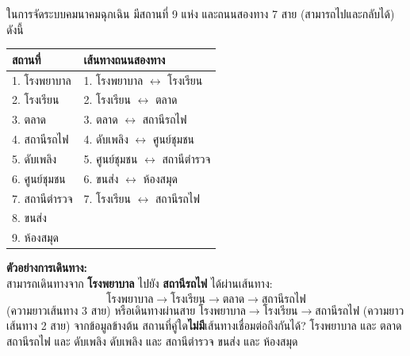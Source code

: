 \question ในการจัดระบบคมนาคมฉุกเฉิน มีสถานที่ 9 แห่ง และถนนสองทาง 7 สาย (สามารถไปและกลับได้) ดังนี้

\begin{tabular}{l | l}
\textbf{สถานที่} & \textbf{เส้นทางถนนสองทาง} \\
\hline
1. โรงพยาบาล & 1. โรงพยาบาล $\leftrightarrow$ โรงเรียน \\
2. โรงเรียน & 2. โรงเรียน $\leftrightarrow$ ตลาด \\
3. ตลาด & 3. ตลาด $\leftrightarrow$ สถานีรถไฟ \\
4. สถานีรถไฟ & 4. ดับเพลิง $\leftrightarrow$ ศูนย์ชุมชน \\
5. ดับเพลิง & 5. ศูนย์ชุมชน $\leftrightarrow$ สถานีตำรวจ \\
6. ศูนย์ชุมชน & 6. ขนส่ง $\leftrightarrow$ ห้องสมุด \\
7. สถานีตำรวจ & 7. โรงเรียน $\leftrightarrow$ สถานีรถไฟ \\
8. ขนส่ง & \\
9. ห้องสมุด & \\
\end{tabular}

\vspace{0.5em}
\textbf{ตัวอย่างการเดินทาง:} \\
สามารถเดินทางจาก \textbf{โรงพยาบาล} ไปยัง \textbf{สถานีรถไฟ} ได้ผ่านเส้นทาง:
$$\text{โรงพยาบาล} \rightarrow \text{โรงเรียน} \rightarrow \text{ตลาด} \rightarrow \text{สถานีรถไฟ}$$ 
(ความยาวเส้นทาง 3 สาย) หรือเดินทางผ่านสาย $\text{โรงพยาบาล} \rightarrow \text{โรงเรียน} \rightarrow \text{สถานีรถไฟ}$ (ความยาวเส้นทาง 2 สาย)
\vspace{0.5em}
จากข้อมูลข้างต้น สถานที่คู่ใด\textbf{ไม่มี}เส้นทางเชื่อมต่อถึงกันได้?
\vspace{0.5em}
\newline
\choicesgrid
{โรงพยาบาล และ ตลาด}
{สถานีรถไฟ และ ดับเพลิง}
{ดับเพลิง และ สถานีตำรวจ}
{ขนส่ง และ ห้องสมุด}
